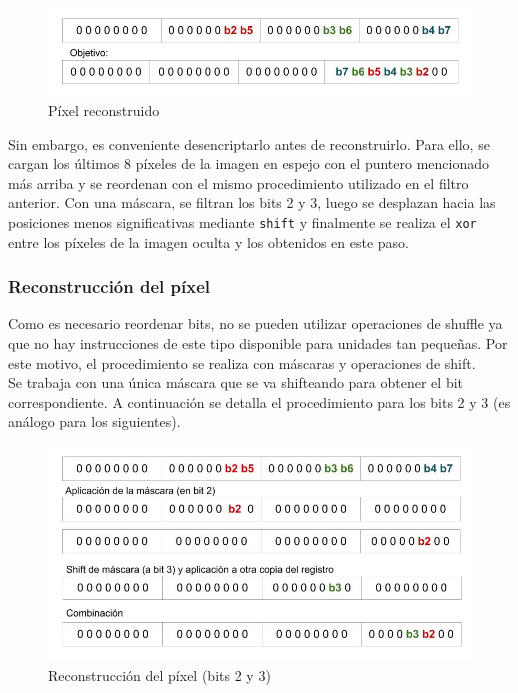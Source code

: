 \documentclass[a4paper]{article}
\begin{document}
\begin{figure}[!htb]
  \begin{center}
	\includegraphics[scale=0.4]{img/descubrir/PixelGSReconstruido.jpg}
	\caption{Píxel reconstruido}
  \end{center}
\end{figure}

Sin embargo, es conveniente desencriptarlo antes de reconstruirlo. Para ello, se cargan los últimos 8 píxeles de la imagen en espejo con el puntero mencionado más arriba y se reordenan con el mismo procedimiento utilizado en el filtro anterior. Con una máscara, se filtran los bits 2 y 3, luego se desplazan hacia las posiciones menos significativas mediante {\tt shift} y finalmente se realiza el {\tt xor} entre los píxeles de la imagen oculta y los obtenidos en este paso.

\subsubsection{Reconstrucción del píxel}
Como es necesario reordenar bits, no se pueden utilizar operaciones de shuffle ya que no hay instrucciones de este tipo disponible para unidades tan pequeñas. Por este motivo, el procedimiento se realiza con máscaras y operaciones de shift. \\
Se trabaja con una única máscara que se va shifteando para obtener el bit correspondiente. A continuación se detalla el procedimiento para los bits 2 y 3 (es análogo para los siguientes).

\begin{figure}[!htb]
  \begin{center}
	\includegraphics[scale=0.4]{img/descubrir/ReconstruccionPx.jpg}
	\caption{Reconstrucción del píxel (bits 2 y 3)}
  \end{center}
\end{figure}
\end{document}
